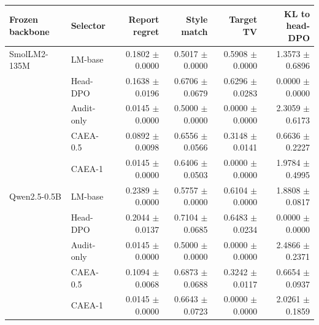 \begin{tabular}{llrrrr}\toprule
Frozen backbone & Selector & Report regret & Style match & Target TV & KL to head-DPO\\\midrule
SmolLM2-135M & LM-base & 0.1802 $\pm$ 0.0000 & 0.5017 $\pm$ 0.0000 & 0.5908 $\pm$ 0.0000 & 1.3573 $\pm$ 0.6896 \\
 & Head-DPO & 0.1638 $\pm$ 0.0196 & 0.6706 $\pm$ 0.0679 & 0.6296 $\pm$ 0.0283 & 0.0000 $\pm$ 0.0000 \\
 & Audit-only & 0.0145 $\pm$ 0.0000 & 0.5000 $\pm$ 0.0000 & 0.0000 $\pm$ 0.0000 & 2.3059 $\pm$ 0.6173 \\
 & CAEA-0.5 & 0.0892 $\pm$ 0.0098 & 0.6556 $\pm$ 0.0566 & 0.3148 $\pm$ 0.0141 & 0.6636 $\pm$ 0.2227 \\
 & CAEA-1 & 0.0145 $\pm$ 0.0000 & 0.6406 $\pm$ 0.0503 & 0.0000 $\pm$ 0.0000 & 1.9784 $\pm$ 0.4995 \\
Qwen2.5-0.5B & LM-base & 0.2389 $\pm$ 0.0000 & 0.5757 $\pm$ 0.0000 & 0.6104 $\pm$ 0.0000 & 1.8808 $\pm$ 0.0817 \\
 & Head-DPO & 0.2044 $\pm$ 0.0137 & 0.7104 $\pm$ 0.0685 & 0.6483 $\pm$ 0.0234 & 0.0000 $\pm$ 0.0000 \\
 & Audit-only & 0.0145 $\pm$ 0.0000 & 0.5000 $\pm$ 0.0000 & 0.0000 $\pm$ 0.0000 & 2.4866 $\pm$ 0.2371 \\
 & CAEA-0.5 & 0.1094 $\pm$ 0.0068 & 0.6873 $\pm$ 0.0688 & 0.3242 $\pm$ 0.0117 & 0.6654 $\pm$ 0.0937 \\
 & CAEA-1 & 0.0145 $\pm$ 0.0000 & 0.6643 $\pm$ 0.0723 & 0.0000 $\pm$ 0.0000 & 2.0261 $\pm$ 0.1859 \\
\bottomrule\end{tabular}

